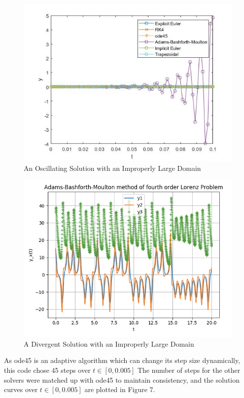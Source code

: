 \documentclass[11pt]{article}
\begin{document}
\begin{figure} [h]
\centering
        \includegraphics[totalheight=10cm]{figure3.jpg}
    \caption{An Oscillating Solution with an Improperly Large Domain}
    \label{fig:verticalcell}
\end{figure}

\begin{figure} [h]
\centering
        \includegraphics[totalheight=10cm]{original.png}
    \caption{A Divergent Solution with an Improperly Large Domain}
    \label{fig:verticalcell}
\end{figure}

As ode45 is an adaptive algorithm which can change its step size dynamically,
this code chose 45 steps over $t\in [0,0.005]$ The number of steps for the other 
solvers were matched up with ode45 to maintain consistency, and the solution curves 
over $t\in [0,0.005]$ are plotted in Figure 7.
\end{document}
